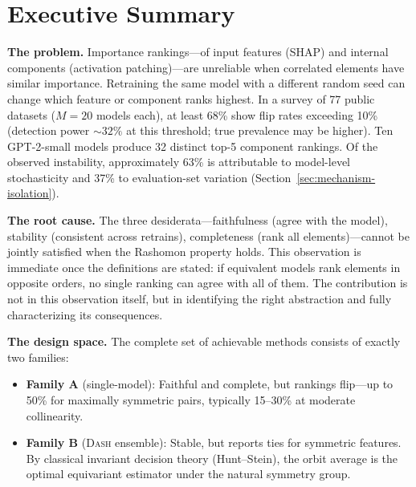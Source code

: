 \documentclass{article}
\newcommand{\DASH}{\textsc{Dash}}
\begin{document}
\begin{abstract}
The framework is mechanically verified in Lean~4 (368 theorems, 6 axioms, 0~\texttt{sorry}). The formalization caught two logical inconsistencies and one type mismatch that survived informal review.

Code and Lean proofs: \url{https://github.com/DrakeCaraker/dash-impossibility-lean} (DOI: \url{https://doi.org/10.5281/zenodo.19468379}).
\end{abstract}

\section*{Executive Summary}

\noindent\textbf{The problem.} Importance rankings---of input features (SHAP) and internal components (activation patching)---are unreliable when correlated elements have similar importance. Retraining the same model with a different random seed can change which feature or component ranks highest. In a survey of 77 public datasets ($M{=}20$ models each), at least 68\% show flip rates exceeding 10\% (detection power ${\sim}32\%$ at this threshold; true prevalence may be higher). Ten GPT-2-small models produce 32 distinct top-5 component rankings. Of the observed instability, approximately 63\% is attributable to model-level stochasticity and 37\% to evaluation-set variation (Section~\ref{sec:mechanism-isolation}).

\noindent\textbf{The root cause.} The three desiderata---faithfulness (agree with the model), stability (consistent across retrains), completeness (rank all elements)---cannot be jointly satisfied when the Rashomon property holds. This observation is immediate once the definitions are stated: if equivalent models rank elements in opposite orders, no single ranking can agree with all of them. The contribution is not in this observation itself, but in identifying the right abstraction and fully characterizing its consequences.

\noindent\textbf{The design space.} The complete set of achievable methods consists of exactly two families:
\begin{itemize}
    \item \textbf{Family A} (single-model): Faithful and complete, but rankings flip---up to 50\% for maximally symmetric pairs, typically 15--30\% at moderate collinearity.
    \item \textbf{Family B} (\DASH{} ensemble): Stable, but reports ties for symmetric features. By classical invariant decision theory (Hunt--Stein), the orbit average is the optimal equivariant estimator under the natural symmetry group.
\end{itemize}
\end{document}
